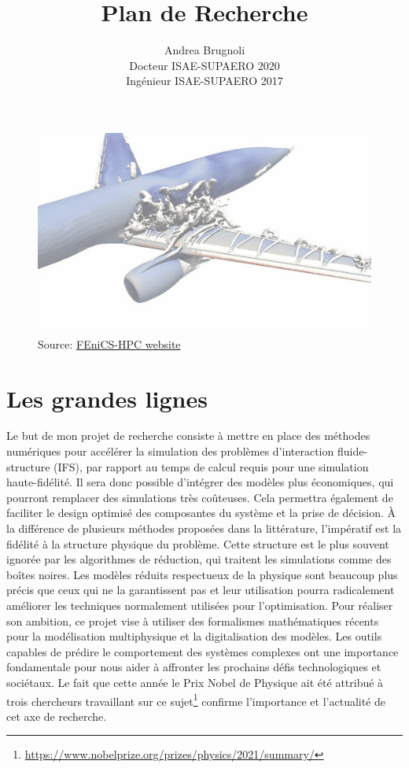 \documentclass[12pt, french]{article}
\author{Andrea Brugnoli \\ 
	\hspace{2.8pt} Docteur ISAE-SUPAERO 2020\\
	Ingénieur ISAE-SUPAERO 2017}
\title{Plan de Recherche}
\date{}
\begin{document}
	
	\maketitle
	
	\begin{figure}[h]
		\centering
		\includegraphics[width=.95\textwidth]{3Dplane.jpg}
		\captionsetup{labelformat=empty}
		\caption{Source: \href{http://www.fenics-hpc.org/}{FEniCS-HPC website}}
	\end{figure}
	
	
	
	
	
	\thispagestyle{empty}
	
	\newpage
	
	\tableofcontents
	\newpage
	
	
	\section{Les grandes lignes}
	
	Le but de mon projet de recherche consiste à mettre en place des méthodes numériques
	pour accélérer la simulation des problèmes d'interaction fluide-structure (IFS), par rapport au temps de calcul requis pour une simulation haute-fidélité. Il sera donc possible d'intégrer des modèles plus économiques, qui pourront remplacer des simulations très coûteuses. Cela permettra également de faciliter le design optimisé des composantes du système et la prise de décision. À la différence de plusieurs méthodes proposées dans la littérature, l'impératif est la fidélité à la structure physique du problème.  Cette structure est le plus souvent ignorée par les algorithmes de réduction, qui traitent les simulations comme des boîtes noires. Les modèles réduits respectueux de la physique sont beaucoup plus précis que ceux qui ne la garantissent pas et leur utilisation pourra radicalement améliorer les techniques normalement utilisées pour l'optimisation. Pour réaliser son ambition, ce projet vise à utiliser des formalismes mathématiques récents pour la modélisation multiphysique et la digitalisation des modèles. Les outils capables de prédire le comportement des systèmes complexes ont une importance fondamentale pour nous aider à affronter les prochains défis technologiques et sociétaux. Le fait que cette année le Prix Nobel de Physique ait été attribué à trois chercheurs travaillant sur ce sujet\footnote{\url{https://www.nobelprize.org/prizes/physics/2021/summary/}} confirme
	l'importance et l'actualité de cet axe de recherche.
	
\end{document}
